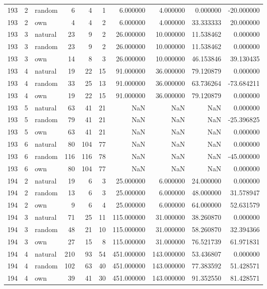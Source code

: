 \begin{table}[htbp]
\begin{tabular}{rrlrrrrrrr}
193 & 2 & random & 6 & 4 & 1 & 6.000000 & 4.000000 & 0.000000 & -20.000000 \\
193 & 2 & own & 4 & 4 & 2 & 6.000000 & 4.000000 & 33.333333 & 20.000000 \\
193 & 3 & natural & 23 & 9 & 2 & 26.000000 & 10.000000 & 11.538462 & 0.000000 \\
193 & 3 & random & 23 & 9 & 2 & 26.000000 & 10.000000 & 11.538462 & 0.000000 \\
193 & 3 & own & 14 & 8 & 3 & 26.000000 & 10.000000 & 46.153846 & 39.130435 \\
193 & 4 & natural & 19 & 22 & 15 & 91.000000 & 36.000000 & 79.120879 & 0.000000 \\
193 & 4 & random & 33 & 25 & 13 & 91.000000 & 36.000000 & 63.736264 & -73.684211 \\
193 & 4 & own & 19 & 22 & 15 & 91.000000 & 36.000000 & 79.120879 & 0.000000 \\
193 & 5 & natural & 63 & 41 & 21 & NaN & NaN & NaN & 0.000000 \\
193 & 5 & random & 79 & 41 & 21 & NaN & NaN & NaN & -25.396825 \\
193 & 5 & own & 63 & 41 & 21 & NaN & NaN & NaN & 0.000000 \\
193 & 6 & natural & 80 & 104 & 77 & NaN & NaN & NaN & 0.000000 \\
193 & 6 & random & 116 & 116 & 78 & NaN & NaN & NaN & -45.000000 \\
193 & 6 & own & 80 & 104 & 77 & NaN & NaN & NaN & 0.000000 \\
194 & 2 & natural & 19 & 6 & 3 & 25.000000 & 6.000000 & 24.000000 & 0.000000 \\
194 & 2 & random & 13 & 6 & 3 & 25.000000 & 6.000000 & 48.000000 & 31.578947 \\
194 & 2 & own & 9 & 6 & 4 & 25.000000 & 6.000000 & 64.000000 & 52.631579 \\
194 & 3 & natural & 71 & 25 & 11 & 115.000000 & 31.000000 & 38.260870 & 0.000000 \\
194 & 3 & random & 48 & 21 & 10 & 115.000000 & 31.000000 & 58.260870 & 32.394366 \\
194 & 3 & own & 27 & 15 & 8 & 115.000000 & 31.000000 & 76.521739 & 61.971831 \\
194 & 4 & natural & 210 & 93 & 54 & 451.000000 & 143.000000 & 53.436807 & 0.000000 \\
194 & 4 & random & 102 & 63 & 40 & 451.000000 & 143.000000 & 77.383592 & 51.428571 \\
194 & 4 & own & 39 & 41 & 30 & 451.000000 & 143.000000 & 91.352550 & 81.428571 \\

\end{tabular}
\end{table}
